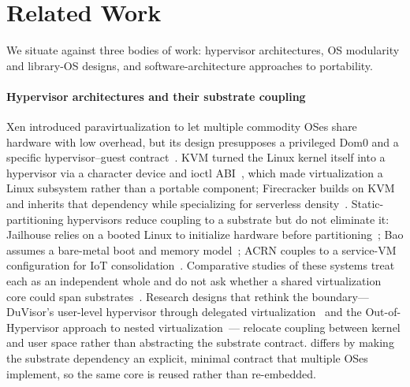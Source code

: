 \section{Related Work}

We situate \axvisor{} against three bodies of work: hypervisor architectures, OS
modularity and library-OS designs, and software-architecture approaches to
portability.

\paragraph{Hypervisor architectures and their substrate coupling}
Xen introduced paravirtualization to let multiple commodity OSes share hardware
with low overhead, but its design presupposes a privileged Dom0 and a specific
hypervisor--guest contract~\cite{barham2003xen}. KVM turned the Linux kernel
itself into a hypervisor via a character device and ioctl
ABI~\cite{kivity2007kvm}, which made virtualization a Linux subsystem rather
than a portable component; Firecracker builds on KVM and inherits that
dependency while specializing for serverless density~\cite{agache2020firecracker}.
Static-partitioning hypervisors reduce coupling to a substrate but do not
eliminate it: Jailhouse relies on a booted Linux to initialize hardware before
partitioning~\cite{ramsauer2017jailhouse}; Bao assumes a bare-metal boot and
memory model~\cite{martins2020bao}; ACRN couples to a service-VM configuration
for IoT consolidation~\cite{li2019acrn}. Comparative studies of these systems
treat each as an independent whole and do not ask whether a shared
virtualization core could span substrates~\cite{lozano2023comprehensive}.
Research designs that rethink the boundary---DuVisor's user-level hypervisor
through delegated virtualization~\cite{chen2022duvisor} and the
Out-of-Hypervisor approach to nested virtualization~\cite{bitchebe2022ooh}---
relocate coupling between kernel and user space rather than abstracting the
substrate contract. \axvisor{} differs by making the substrate dependency an
explicit, minimal contract that multiple OSes implement, so the same core is
reused rather than re-embedded.

